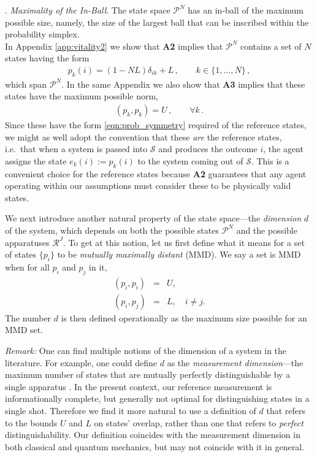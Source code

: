 \documentclass[%
 reprint,superscriptaddress,
 amsmath,amssymb,
 aps,twocolumn,pra
]{revtex4-1}
\newcommand{\eqn}[1]{\begin{eqnarray} #1 \end{eqnarray}}
\newcommand{\tit}[1]{\textit{#1}}
\begin{document}
. \tit{Maximality of the In-Ball}. The state space $\mathcal{P}^N$ has an in-ball of the maximum possible size, namely, the size of the largest ball that can be inscribed within the probability simplex.\\

In Appendix \ref{app:vitality2} we show that {\bf A2} implies that $\mathcal{P}^N$ contains a set of $N$ states having the form
\eqn{ \label{eqn:basis_states}
p_k(i) = (1-NL)\delta_{ik} + L \, , \qquad k \in \{1,\dots, N\} \, ,
}
which span $\mathcal{P}^N$. In the same Appendix we also show that {\bf A3} implies that these states have the maximum possible norm,
\eqn{ \label{eqn:extremality}
(p_k,p_k) = U \, , \qquad \forall k \, .
}
Since these have the form \eqref{eqn:prob_symmetry} required of the reference states, we might as well adopt the convention that these \tit{are} the reference states, i.e.\ that when a system is passed into $\mathcal{S}$ and produces the outcome $i$, the agent assigns the state $e_k(i) := p_k(i)$ to the system coming out of $\mathcal{S}$. This is a convenient choice for the reference states because {\bf A2} guarantees that any agent operating within our assumptions must consider these to be physically valid states.

We next introduce another natural property of the state space---the \tit{dimension} $d$ of the system, which depends on both the possible states $\mathcal{P}^N$ and the possible apparatuses $\mathcal{R}^J$. To get at this notion, let us first define what it means for a set of states $\{p_i\}$ to be \tit{mutually maximally distant} (MMD).  We say a set is MMD when for all $p_i$ and $p_j$ in it,
\eqn{
(p_i, p_i) &=& U, \nonumber \\
(p_i, p_j) &=& L,  \quad  i \neq j.
}
The number $d$ is then defined operationally as the maximum size possible for an MMD set.

\tit{Remark:} One can find multiple notions of the dimension of a system in the literature. For example, one could define $d$ as the \tit{measurement dimension}---the maximum number of states that are mutually perfectly distinguishable by a single apparatus \cite{BRU14}. In the present context, our reference measurement is informationally complete, but generally not optimal for distinguishing states in a single shot. Therefore we find it more natural to use a definition of $d$ that refers to the bounds $U$ and $L$ on states' overlap, rather than one that refers to \tit{perfect} distinguishability. Our definition coincides with the measurement dimension in both classical and quantum mechanics, but may not coincide with it in general.
\end{document}
